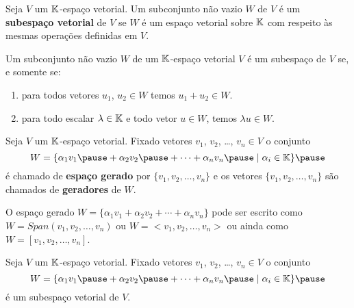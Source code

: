 \documentclass{beamer}
\begin{document}
\begin{frame}
  \begin{definicao}
    Seja $V$ um $\mathbb{K}$-espaço vetorial. \pause Um subconjunto não vazio $W$ \pause de $V$ é um \textbf{subespaço vetorial} de $V$ \pause se $W$ é um espaço vetorial
    sobre $\mathbb{K}$ \pause com respeito às mesmas operações definidas em $V$.\pause
  \end{definicao}

  \begin{teorema}
    Um subconjunto não vazio $W$ \pause de um $\mathbb{K}$-espaço vetorial $V$ \pause é um subespaço de $V$ \pause se, e somente se:
    \begin{enumerate}[label={\roman*})]
      \item para todos vetores $u_1$, $u_2 \in W$ \pause temos $u_1 + u_2 \in W$.\pause
      \item para todo escalar $\lambda \in \mathbb{K}$ \pause e todo vetor $u \in W$, \pause temos $\lambda u\in W$.
    \end{enumerate}
  \end{teorema}
\end{frame}

\begin{frame}
  \begin{definicao}
    Seja $V$ um $\mathbb{K}$-espaço vetorial. \pause Fixado vetores $v_1$, $v_2$, \dots, $v_n \in V$ \pause o conjunto
    \[
      W = \{\alpha_1v_1 \pause + \alpha_2v_2 \pause + \cdots + \alpha_nv_n \pause \mid \alpha_i \in \cp{K}\}\pause
    \]
    é chamado de \textbf{espaço gerado} \pause por $\{v_1, v_2, \dots, v_n\}$ \pause e os vetores $\{v_1, v_2, \dots, v_n\}$ \pause são chamados de \textbf{geradores} de $W$.\pause
  \end{definicao}

  \begin{notacao}
    O espaço gerado $W = \{\alpha_1v_1 + \alpha_2v_2 + \cdots + \alpha_nv_n\}$ \pause pode ser escrito como $W = Span(v_1, v_2, \dots, v_n)$ \pause ou $W = <v_1, v_2, \dots, v_n>$ \pause ou ainda como $W = [v_1, v_2, \dots, v_n]$.
  \end{notacao}
\end{frame}

\begin{frame}
  \begin{proposicao}
    Seja $V$ um $\mathbb{K}$-espaço vetorial. \pause Fixado vetores $v_1$, $v_2$, \dots, $v_n \in V$ \pause o conjunto
    \[
      W = \{\alpha_1v_1 \pause + \alpha_2v_2 \pause + \cdots + \alpha_nv_n \pause \mid \alpha_i \in \cp{K}\}\pause
    \]
    é um subespaço vetorial de $V$.
  \end{proposicao}
\end{frame}
\end{document}
